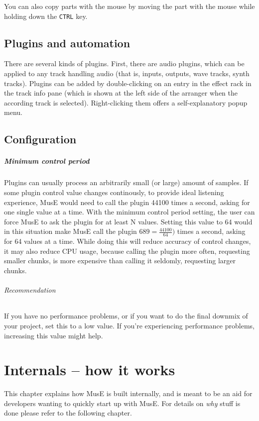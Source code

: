 \documentclass[a4paper]{report}
\begin{document}
You can also copy parts with the mouse by moving the part with the mouse
while holding down the \texttt{CTRL} key.



\section{Plugins and automation} \label{plugins}
There are several kinds of plugins. First, there are audio plugins, which
can be applied to any track handling audio (that is, inputs, outputs,
wave tracks, synth tracks). Plugins can be added by double-clicking
on an entry in the effect rack in the track info pane (which is shown
at the left side of the arranger when the according track is selected).
Right-clicking them offers a self-explanatory popup menu.

\section{Configuration}
\paragraph{Minimum control period}
Plugins can usually process an arbitrarily small (or large) amount of
samples. If some plugin control value changes continously, to provide
ideal listening experience, MusE would need to call the plugin 44100
times a second, asking for one single value at a time. With the minimum
control period setting, the user can force MusE to ask the plugin for
at least N values. Setting this value to 64 would in this situation
make MusE call the plugin $689 = \frac{44100}{64})$ times a second,
asking for 64 values at a time. While doing this will reduce accuracy
of control changes, it may also reduce CPU usage, because calling
the plugin more often, requesting smaller chunks, is more expensive
than calling it seldomly, requesting larger chunks.
\subparagraph{Recommendation}
If you have no performance problems, or if you want to do the final
downmix of your project, set this to a low value. If you're experiencing
performance problems, increasing this value might help.






\chapter{Internals -- how it works}
This chapter explains how MusE is built internally, and is meant
to be an aid for developers wanting to quickly start up with MusE.
For details on \emph{why} stuff is done please refer to the following
chapter.
\end{document}
